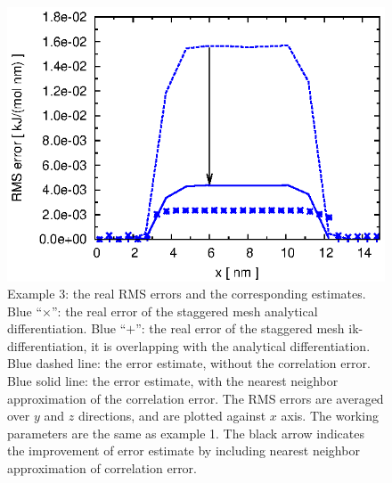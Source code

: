 \documentclass[aps,pre,preprint]{revtex4}
\begin{document}
\begin{figure}
  \centering
  \includegraphics[]{fig.new//fig.water.ana.st.error.eps}
  \caption{
    Example 3: the real RMS errors and the corresponding
    estimates. 
    Blue ``$\times$'': the real error of the staggered mesh
    analytical differentiation.
    Blue ``$+$'': the real error of the staggered mesh
    ik-differentiation, it is overlapping with the analytical differentiation.
    Blue dashed line: the error estimate, without the correlation error.
    Blue solid line: the error estimate, with the nearest
    neighbor approximation of the correlation error.
    The RMS errors are averaged over $y$ and $z$ directions, and are
    plotted against $x$ axis.
    The working parameters are the same as example 1.
    The black arrow indicates the improvement
    of error estimate by including nearest neighbor
    approximation of correlation error.
  }   
  \label{fig:water-error}
\end{figure}
\end{document}
